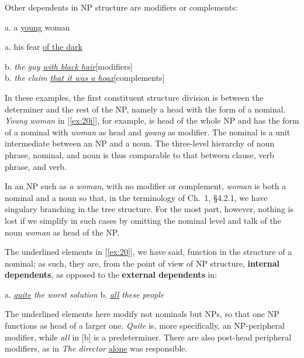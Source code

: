 Other dependents in NP structure are modifiers or complements:
\begin{examples}
\item \label{ex:20}
\begin{minipage}[t]{0.3\linewidth}\vspace{-6pt}
    \begin{examples}
        \item \label{ex:20i} \textnormal{a.} a \uline{young} woman
        \item \label{ex:20ii} \textnormal{a.} his fear \uline{of the dark}
    \end{examples}
\end{minipage}\hfill
\begin{minipage}[t]{0.6\linewidth}
    b. \textit{the guy \uline{with black hair}}\hfill[modifiers] \\
    b. \textit{the claim \uline{that it was a hoax}}\hfill[complements] 
\end{minipage}
\end{examples}
In these examples, the first constituent structure division is between the determiner and the rest of the NP, namely a head with the form of a {nominal}. \textit{Young woman} in [\ref{ex:20i}], for example, is head of the whole NP and has the form of a nominal with \textit{woman} as head and \textit{young} as modifier. The nominal is a unit intermediate between an NP and a noun. The three-level hierarchy of noun phrase, nominal, and noun is thus comparable to that between clause, verb phrase, and verb. 

{In an NP such as \textit{a woman}, with no modifier or complement, \textit{woman} is both a nominal and a noun so that, in the terminology of Ch.~1, §4.2.1, we have singulary branching in the tree structure. For the most part, however, nothing is lost if we simplify in such cases by omitting the nominal level and talk of the noun \textit{woman} as head of the NP.}

The underlined elements in [\ref{ex:20}], we have said, function in the structure of a nominal; as such, they are, from the point of view of NP structure, \textbf{internal dependents}, as opposed to the \textbf{external dependents} in:
\begin{examples}
\item \label{ex:21}
        a. \textit{\uline{quite} the worst solution}\hspace{3em}
        b. \textit{\uline{all} these people}
\end{examples}
The underlined elements here modify not nominals but NPs, so that one NP functions as head of a larger one. \textit{Quite} is, more specifically, an NP-peripheral modifier, while \textit{all} in [b] is a predeterminer. There are also post-head peripheral modifiers, as in \ob\textit{The director} \uline{alone} was responsible\cb.

